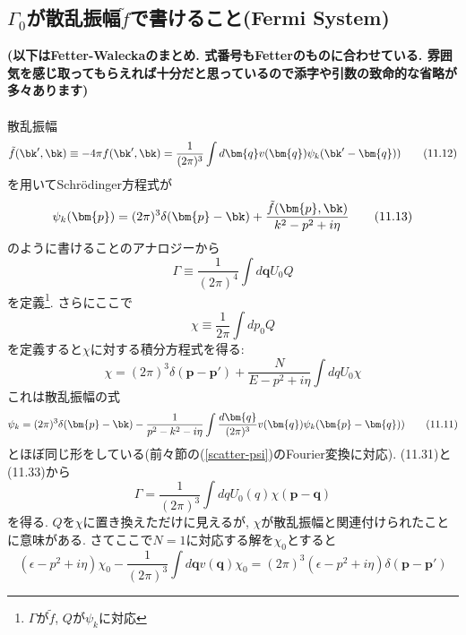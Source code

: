 \documentclass[10.5pt,a4paper]{jreport}
\begin{document}
\subsection{$\Gamma_0$が散乱振幅$\tilde{f}$で書けること(Fermi System)}
\textbf{(以下はFetter-Waleckaのまとめ. 式番号もFetterのものに合わせている. 雰囲気を感じ取ってもらえれば十分だと思っているので添字や引数の致命的な省略が多々あります)}\\\\
散乱振幅
\begin{equation}
  \tilde{f}(\bk', \bk) \equiv -4\pi f(\bk', \bk) = \frac{1}{(2\pi)^3}\int d\bm{q}v(\bm{q})\psi_k(\bk' - \bm{q}))\tag{11.12}
\end{equation}
を用いてSchr\"odinger方程式が
\begin{equation}
  \psi_k(\bm{p}) = (2\pi)^3\delta(\bm{p} - \bk) + \frac{\tilde{f}(\bm{p}, \bk)}{k^2 - p^2 + i\eta}\tag{11.13}
\end{equation}
のように書けることのアナロジーから
\begin{equation}
  \Gamma \equiv \frac{1}{(2\pi)^4}\int d\bm{q}U_0Q\tag{11.31}
\end{equation}
を定義\footnote{$\Gamma$が$\tilde{f}$, $Q$が$\psi_k$に対応}. さらにここで
\begin{equation}
  \chi \equiv \frac{1}{2\pi}\int dp_0 Q\tag{11.33}
\end{equation}
を定義すると$\chi$に対する積分方程式を得る:
\begin{equation}
  \chi = (2\pi)^3\delta(\bm{p} - \bm{p}') + \frac{N}{E-p^2 + i\eta}\int dq U_0\chi\tag{11.39}
\end{equation}
これは散乱振幅の式
\begin{equation}
  \psi_k = (2\pi)^3\delta(\bm{p} - \bk) - \frac{1}{p^2 - k^2 -i\eta}\int\frac{d\bm{q}}{(2\pi)^3}v(\bm{q})\psi_k(\bm{p} - \bm{q}))\tag{11.11}
\end{equation}
とほぼ同じ形をしている(前々節の(\ref{scatter-psi})のFourier変換に対応). (11.31)と(11.33)から
\begin{equation}
  \Gamma = \frac{1}{(2\pi)^3}\int dq U_0(q)\chi(\bm{p} -\bm{q})\tag{11.40}
\end{equation}
を得る. $Q$を$\chi$に置き換えただけに見えるが, $\chi$が散乱振幅と関連付けられたことに意味がある. さてここで$N=1$に対応する解を$\chi_0$とすると
\begin{equation}
  (\epsilon - p^2 + i\eta)\chi_0 - \frac{1}{(2\pi)^3}\int d\bm{q} v(\bm{q})\chi_0 = (2\pi)^3(\epsilon - p^2 + i\eta)\delta(\bm{p} - \bm{p}')\tag{11.42}
\end{equation}
\end{document}
